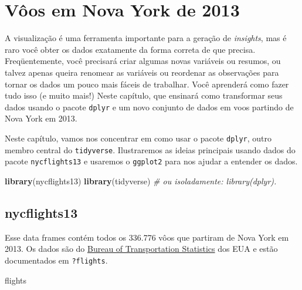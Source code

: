 \documentclass[]{book}
\newenvironment{Shaded}{\begin{snugshade}}{\end{snugshade}}
\newcommand{\CommentTok}[1]{\textcolor[rgb]{0.56,0.35,0.01}{\textit{#1}}}
\newcommand{\KeywordTok}[1]{\textcolor[rgb]{0.13,0.29,0.53}{\textbf{#1}}}
\newcommand{\NormalTok}[1]{#1}
\begin{document}
\hypertarget{application}{%
\chapter{Vôos em Nova York de 2013}\label{application}}

A visualização é uma ferramenta importante para a geração de \emph{insights}, mas é raro você obter os dados exatamente da forma correta de que precisa. Freqüentemente, você precisará criar algumas novas variáveis ou resumos, ou talvez apenas queira renomear as variáveis ou reordenar as observações para tornar os dados um pouco mais fáceis de trabalhar. Você aprenderá como fazer tudo isso (e muito mais!) Neste capítulo, que ensinará como transformar seus dados usando o pacote \texttt{dplyr} e um novo conjunto de dados em voos partindo de Nova York em 2013.

Neste capítulo, vamos nos concentrar em como usar o pacote \texttt{dplyr}, outro membro central do \texttt{tidyverse}. Ilustraremos as ideias principais usando dados do pacote \texttt{nycflights13} e usaremos o \texttt{ggplot2} para nos ajudar a entender os dados.

\begin{Shaded}
\begin{Highlighting}[]
\KeywordTok{library}\NormalTok{(nycflights13)}
\KeywordTok{library}\NormalTok{(tidyverse) }\CommentTok{# ou isoladamente: library(dplyr).}
\end{Highlighting}
\end{Shaded}

\hypertarget{nycflights13}{%
\section{nycflights13}\label{nycflights13}}

Esse data frames contém todos os 336.776 vôos que partiram de Nova York em 2013. Os dados são do \href{https://www.transtats.bts.gov/DatabaseInfo.asp?DB_ID=120\&Link=0}{Bureau of Transportation Statistics} dos EUA e estão documentados em \texttt{?flights}.

\begin{Shaded}
\begin{Highlighting}[]
\NormalTok{flights}
\end{Highlighting}
\end{Shaded}
\end{document}
